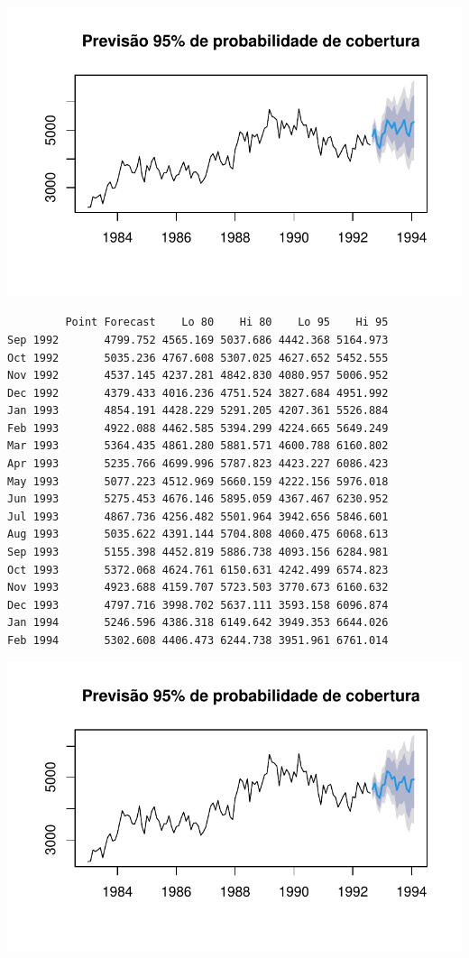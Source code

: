 \documentclass[
  letterpaper,
  DIV=11,
  numbers=noendperiod]{scrartcl}
\begin{document}
\includegraphics{T2_grupo5_files/figure-pdf/previsao-pontual-2.pdf}

\begin{verbatim}
         Point Forecast    Lo 80    Hi 80    Lo 95    Hi 95
Sep 1992       4799.752 4565.169 5037.686 4442.368 5164.973
Oct 1992       5035.236 4767.608 5307.025 4627.652 5452.555
Nov 1992       4537.145 4237.281 4842.830 4080.957 5006.952
Dec 1992       4379.433 4016.236 4751.524 3827.684 4951.992
Jan 1993       4854.191 4428.229 5291.205 4207.361 5526.884
Feb 1993       4922.088 4462.585 5394.299 4224.665 5649.249
Mar 1993       5364.435 4861.280 5881.571 4600.788 6160.802
Apr 1993       5235.766 4699.996 5787.823 4423.227 6086.423
May 1993       5077.223 4512.969 5660.159 4222.156 5976.018
Jun 1993       5275.453 4676.146 5895.059 4367.467 6230.952
Jul 1993       4867.736 4256.482 5501.964 3942.656 5846.601
Aug 1993       5035.622 4391.144 5704.808 4060.475 6068.613
Sep 1993       5155.398 4452.819 5886.738 4093.156 6284.981
Oct 1993       5372.068 4624.761 6150.631 4242.499 6574.823
Nov 1993       4923.688 4159.707 5723.503 3770.673 6160.632
Dec 1993       4797.716 3998.702 5637.111 3593.158 6096.874
Jan 1994       5246.596 4386.318 6149.642 3949.353 6644.026
Feb 1994       5302.608 4406.473 6244.738 3951.961 6761.014
\end{verbatim}

\includegraphics{T2_grupo5_files/figure-pdf/previsao-pontual-3.pdf}
\end{document}
